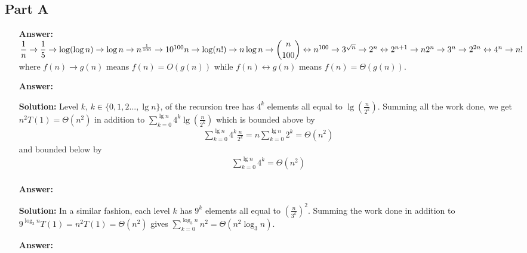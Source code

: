 \documentclass[12pt,twoside]{article}
\begin{document}
\begin{problems}
\section*{Part A}
\problem
\setdefaultleftmargin{8cm}{2cm}{}{}{}{}
\begin{itemize}
\item [\textbf{Answer:} ] $\dfrac{1}{n}\rightarrow \dfrac{1}{5}\rightarrow \log (\log n) \rightarrow \log{n} \rightarrow n^{\frac{1}{100}} \rightarrow 10^{100} n \rightarrow \log (n!) \rightarrow n\log n \rightarrow \dbinom{n}{100}\leftrightarrow n^{100}\rightarrow 3^{\sqrt{n}} \rightarrow 2^n \leftrightarrow 2^{n+1} \rightarrow n2^n\rightarrow 3^n \rightarrow 2^{2n} \leftrightarrow 4^n \rightarrow n!$ where $f(n) \rightarrow g(n)$ means $f(n) = O(g(n))$ while $f(n) \leftrightarrow g(n)$ means $f(n)=\Theta(g(n))$.
\end{itemize}
\problem
\begin{problemparts}
\problempart 
\begin{itemize}
\item [\textbf{Answer:}]  
\item [\textbf{Solution:} ] Level $k$, $k\in\{0,1,2..., \lg n\}$, of the recursion tree has $4^k$ elements all equal to $\lg (\frac{n}{2^k})$. Summing all the work done, we get $n^2 T(1)=\Theta(n^2)$ in addition to $\sum_{k=0}^{\lg n} 4^k \lg(\frac{n}{2^k})$ which is bounded above by
\begin{gather*}
\sum_{k=0}^{\lg n} 4^k \frac{n}{2^k} = n \sum_{k=0}^{\lg n} 2^k = \Theta(n^2)
\end{gather*}
and bounded below by
\begin{gather*}
\sum_{k=0}^{\lg n} 4^k = \Theta(n^2)
\\
\end{gather*}
\end{itemize}
\problempart
\begin{itemize}
\item [\textbf{Answer:}] 
\item [\textbf{Solution:}] In a similar fashion, each level $k$ has $9^k$ elements all equal to $(\frac{n}{3^k})^2$. Summing the work done in addition to $9^{\log_3 n} T(1)=n^2T(1)=\Theta(n^2)$ gives $\sum_{k=0}^{\log_3 n} n^2=\Theta(n^2 \log_3 n)$.
\end{itemize}
\problempart
\begin{itemize}
\item [\textbf{Answer:}] 

\end{itemize}
\end{problemparts}
\end{problems}
\end{document}
